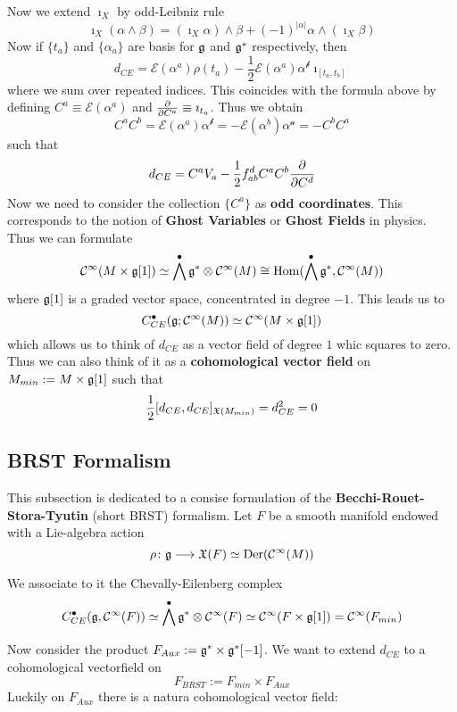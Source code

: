 Now we extend $\imath_X$ by odd-Leibniz rule
$$ \imath_X(\alpha \wedge \beta) = (\imath_X \alpha) \wedge \beta + (-1)^{|\alpha|} \alpha \wedge (\imath_X \beta) $$
Now if $\{t_a\}$ and $\{\alpha_a\}$ are basis for $\mathfrak{g}$ and $\mathfrak{g}^*$ respectively, then
$$ d_{CE} = \mathcal{E}(\alpha^a) \rho(t_a) - \frac{1}{2} \mathcal{E}(\alpha^a) \mathcal{\alpha^b} \imath_{[t_a, t_b]} $$
where we sum over repeated indices. This coincides with the formula above by defining $C^a \equiv \mathcal{E}(\alpha^a)$ and $\frac{\partial }{\partial C^a} \equiv \imath_{t_a}$. Thus we obtain
$$ C^a C^b = \mathcal{E}(\alpha^a) \mathcal{\alpha^b} = - \mathcal{E}(\alpha^b) \mathcal{\alpha^a} = - C^b C^a $$
such that
$$ d_{CE} = C^a V_a - \frac{1}{2} f_{ab}^d C^a C^b \frac{\partial }{\partial C^d} $$
Now we need to consider the collection $\{C^a\}$ as \textbf{odd coordinates}. This corresponds to the notion of \textbf{Ghost Variables} or \textbf{Ghost Fields} in physics. Thus we can formulate
$$ \mathcal{C}^{\infty}(M \times \mathfrak{g}[1]) \simeq \bigwedge^\bullet \mathfrak{g}^* \otimes \mathcal{C}^{\infty}(M) \cong \operatorname{Hom}(\bigwedge^\bullet \mathfrak{g}^*, \mathcal{C}^{\infty}(M)) $$
where $\mathfrak{g}[1]$ is a graded vector space, concentrated in degree $-1$. This leads us to
$$ C_{CE}^\bullet (\mathfrak{g} ; \mathcal{C}^{\infty}(M)) \simeq \mathcal{C}^{\infty}(M \times \mathfrak{g}[1]) $$
which allows us to think of $d_{CE}$ as a vector field of degree $1$ whic squares to zero. Thus we can also think of it as a \textbf{cohomological vector field} on $M_{min}:=M \times \mathfrak{g}[1]$ such that
$$ \frac{1}{2} [d_{CE}, d_{CE}]_{\mathfrak{X}(M_{min})} = d_{CE}^2 = 0 $$

\subsection{BRST Formalism}

This subsection is dedicated to a consise formulation of the \textbf{Becchi-Rouet-Stora-Tyutin} (short BRST) formalism. Let $F$ be a smooth manifold endowed with a Lie-algebra action
\begin{equation}
  \rho \colon \mathfrak{g} \longrightarrow \mathfrak{X}(F) \simeq \operatorname{Der}(\mathcal{C}^{\infty}(M))
\end{equation}

We associate to it the Chevally-Eilenberg complex
\begin{equation}
  C_{CE}^\bullet (\mathfrak{g}, \mathcal{C}^{\infty}(F)) \simeq \bigwedge^\bullet \mathfrak{g}^* \otimes \mathcal{C}^{\infty}(F) \simeq \mathcal{C}^{\infty}(F \times \mathfrak{g}[1]) = \mathcal{C}^{\infty}(F_{min})
\end{equation}

Now consider the product $F_{Aux} := \mathfrak{g}^* \times \mathfrak{g}^*[-1]$. We want to extend $d_{CE}$ to a cohomological vectorfield on
$$ F_{BRST} := F_{min} \times F_{Aux} $$
Luckily on $F_{Aux}$ there is a natura cohomological vector field:

